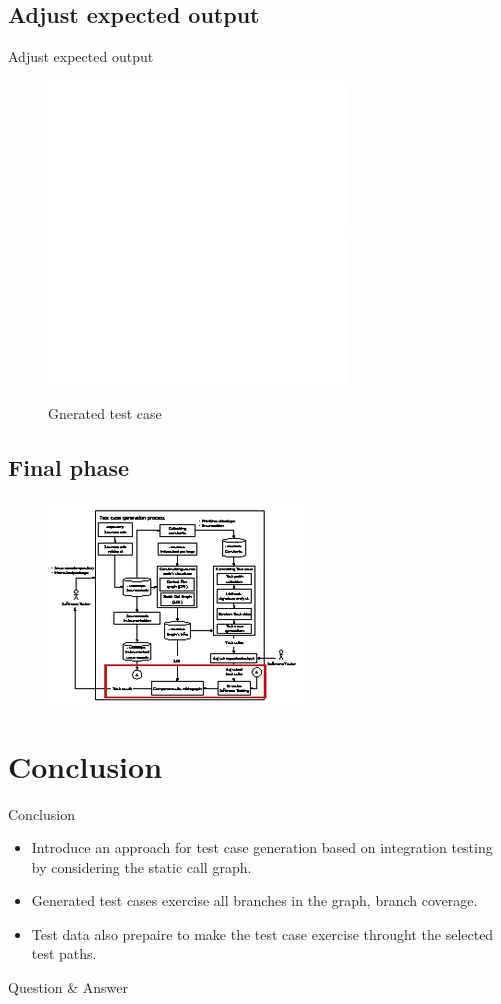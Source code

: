 \documentclass{beamer}
\begin{document}
\subsection{Adjust expected output}
\begin{frame}{Adjust expected output}
    \begin{figure}
        \includegraphics<1>[width=.8\paperwidth]{figure/example-of-generated-test-case.pdf}
        \includegraphics<2>[width=.8\paperwidth]{figure/adjusted-example-of-generated-test-case.pdf}
        \caption{Gnerated test case}
        \label{fig:expectedOutput}
    \end{figure}
\end{frame}

\subsection{Final phase}
\begin{frame}
    \begin{figure}
        \includegraphics[height=0.8\paperheight]{figure/Methodology-Highlight-2}
    \end{figure}
\end{frame}

%
\section{Conclusion}
\begin{frame}{Conclusion}
    \begin{itemize}
        \item Introduce an approach for test case generation based on integration testing by considering the static call graph.
        \item Generated test cases exercise all branches in the graph, branch coverage.
        \item Test data also prepaire to make the test case exercise throught the selected test paths.
    \end{itemize}
\end{frame}

%
\begin{frame}
    \Large{Question \& Answer}
\end{frame}
\end{document}
